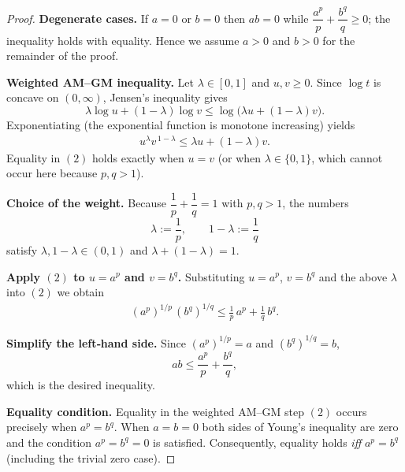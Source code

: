 \begin{proof}
\textbf{Degenerate cases.}
If \(a=0\) or \(b=0\) then \(ab=0\) while \(\dfrac{a^{p}}{p}+\dfrac{b^{q}}{q}\ge 0\); the inequality holds with equality. Hence we assume \(a>0\) and \(b>0\) for the remainder of the proof.

\textbf{Weighted AM–GM inequality.}
Let \(\lambda\in[0,1]\) and \(u,v\ge 0\).  
Since \(\log t\) is concave on \((0,\infty)\), Jensen’s inequality gives
\[
\lambda\log u+(1-\lambda)\log v\le \log\bigl(\lambda u+(1-\lambda)v\bigr).
\]
Exponentiating (the exponential function is monotone increasing) yields
\begin{align*}
u^{\lambda}v^{\,1-\lambda}\le \lambda u+(1-\lambda)v . \tag{2}
\end{align*}
Equality in \((2)\) holds exactly when \(u=v\) (or when \(\lambda\in\{0,1\}\), which cannot occur here because \(p,q>1\)).

\textbf{Choice of the weight.}
Because \(\dfrac1p+\dfrac1q=1\) with \(p,q>1\), the numbers
\[
\lambda:=\frac1p,\qquad 1-\lambda:=\frac1q
\]
satisfy \(\lambda,1-\lambda\in(0,1)\) and \(\lambda+(1-\lambda)=1\).

\textbf{Apply \((2)\) to \(u=a^{p}\) and \(v=b^{q}\).}
Substituting \(u=a^{p}\), \(v=b^{q}\) and the above \(\lambda\) into \((2)\) we obtain
\begin{align*}
(a^{p})^{1/p}\,(b^{q})^{1/q}
\le \frac1p\,a^{p}+\frac1q\,b^{q}.
\end{align*}

\textbf{Simplify the left‑hand side.}
Since \((a^{p})^{1/p}=a\) and \((b^{q})^{1/q}=b\),
\[
ab\le \frac{a^{p}}{p}+\frac{b^{q}}{q},
\]
which is the desired inequality.

\textbf{Equality condition.}
Equality in the weighted AM–GM step \((2)\) occurs precisely when \(a^{p}=b^{q}\).  
When \(a=b=0\) both sides of Young’s inequality are zero and the condition \(a^{p}=b^{q}=0\) is satisfied.  
Consequently, equality holds \emph{iff} \(a^{p}=b^{q}\) (including the trivial zero case).
\end{proof}
